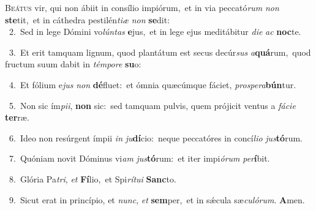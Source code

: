 \lettrine{\initial\textcolor{\initialcolor}{B}}{eátus} vir, qui non ábiit in consílio impiórum,~\dagger et in via peccató\textit{rum} \textit{non} \textbf{ste}\-tit,~\star et in cáthedra pestilén\-\textit{ti}\-\textit{æ} \textit{non} \textbf{se}\-dit:\\
{\numbfont\textcolor{\numbcolor}{~2.}}~Sed in lege Dómini vo\-\textit{lún}\-\textit{tas} \textbf{e}\-jus,~\star et in lege ejus meditábitur \textit{di}\-\textit{e} \textit{ac} \textbf{noc}\-te.\par
{\numbfont\textcolor{\numbcolor}{~3.}}~Et erit tamquam lignum, quod plantátum est secus decúr\textit{sus} \textit{a}\-\textbf{quá}rum,~\star quod fructum suum dabit in \textit{tém}\-\textit{po}\textit{re} \textbf{su}\-o:\par
{\numbfont\textcolor{\numbcolor}{~4.}}~Et fólium e\textit{jus} \textit{non} \textbf{dé}\-fluet:~\star et ómnia quæcúmque fáciet, \textit{pro}\-\textit{spe}\textit{ra}\textbf{bún}tur.\par
{\numbfont\textcolor{\numbcolor}{~5.}}~Non sic ím\-\textit{pi}\-\textit{i}, \textbf{non} sic:~\star sed tamquam pulvis, quem prójicit ventus a \textit{fá}\-\textit{ci}\textit{e} \textbf{ter}\-ræ.\par
{\numbfont\textcolor{\numbcolor}{~6.}}~Ideo non resúrgent ímpii \textit{in} \textit{ju}\-\textbf{dí}cio:~\star neque peccatóres in concí\-\textit{li}\-\textit{o} \textit{jus}\-\textbf{tó}rum.\par
{\numbfont\textcolor{\numbcolor}{~7.}}~Quóniam novit Dóminus vi\textit{am} \textit{jus}\-\textbf{tó}rum:~\star et iter impi\-\textit{ó}\-\textit{rum} \textit{per}\-\textbf{í}bit.\par
{\numbfont\textcolor{\numbcolor}{~8.}}~Glória Pa\-\textit{tri}\-, \textit{et} \textbf{Fí}\-lio,~\star et Spi\-\textit{rí}\-\textit{tu}\textit{i} \textbf{Sanc}\-to.\par
{\numbfont\textcolor{\numbcolor}{~9.}}~Sicut erat in princípio, et \textit{nunc}\-, \textit{et} \textbf{sem}\-per,~\star et in sǽcula sæ\-\textit{cu}\-\textit{ló}\textit{rum}. \textbf{A}\-men.\par
